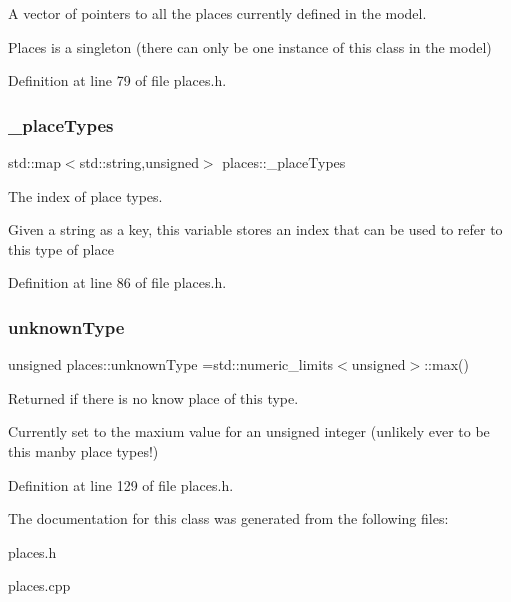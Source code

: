 A vector of pointers to all the places currently defined in the model. 

Places is a singleton (there can only be one instance of this class in the model) 

Definition at line 79 of file places.\+h.

\mbox{\label{classplaces_a7d5529185ae4635d2e2048b4ae475c12}} 
\subsubsection{\texorpdfstring{\+\_\+place\+Types}{\_placeTypes}}
{\footnotesize\ttfamily std\+::map$<$std\+::string,unsigned$>$ places\+::\+\_\+place\+Types\hspace{0.3cm}{\ttfamily [protected]}}



The index of place types. 

Given a string as a key, this variable stores an index that can be used to refer to this type of place 

Definition at line 86 of file places.\+h.

\mbox{\label{classplaces_ab03feda32ddd4784c17de8b2185b3563}} 
\subsubsection{\texorpdfstring{unknown\+Type}{unknownType}}
{\footnotesize\ttfamily unsigned places\+::unknown\+Type =std\+::numeric\+\_\+limits$<$unsigned$>$\+::max()\hspace{0.3cm}{\ttfamily [static]}}



Returned if there is no know place of this type. 

Currently set to the maxium value for an unsigned integer (unlikely ever to be this manby place types!) 

Definition at line 129 of file places.\+h.



The documentation for this class was generated from the following files\+:\begin{DoxyCompactItemize}
\item 
places.\+h\item 
places.\+cpp\end{DoxyCompactItemize}
